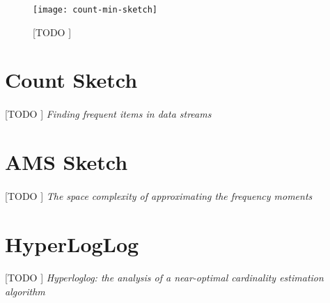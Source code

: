 \documentclass{subfiles}
\begin{document}
      \begin{figure}
        \centering
        \texttt{[image: count-min-sketch]}
        \caption{[TODO ]}
        \label{fig:count_ming_sketch}
      \end{figure}


    \section{Count Sketch}
    \label{sec:count_sketch}

      \paragraph{}
      [TODO ] \emph{Finding frequent items in data streams} \cite{charikar2002finding}

    \section{AMS Sketch}
    \label{sec:ams_sketch}

      \paragraph{}
      [TODO ] \emph{The space complexity of approximating the frequency moments} \cite{alon1996space}

    \section{HyperLogLog}
    \label{sec:hyper_log_log}

      \paragraph{}
      [TODO ] \emph{Hyperloglog: the analysis of a near-optimal cardinality estimation algorithm} \cite{flajolet2007hyperloglog}
\end{document}
